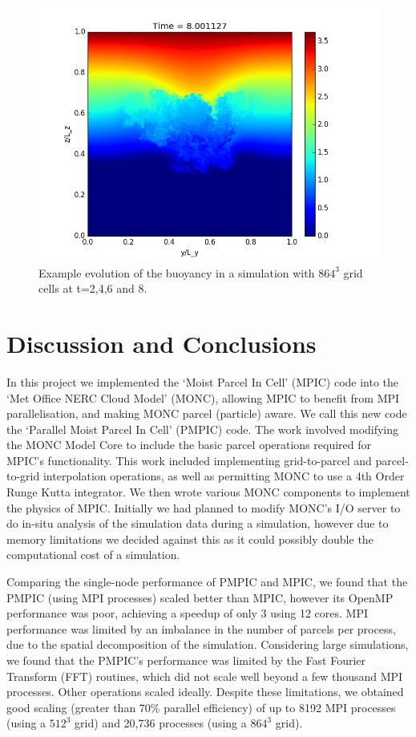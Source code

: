 \documentclass{article}
\begin{document}
\begin{figure}
  \includegraphics[scale=0.4]{pmpic_images/8.png}
  \caption{Example evolution of the buoyancy in a simulation with $864^3$ grid cells at t=2,4,6 and 8.}
  \label{864}
\end{figure}


\section{Discussion and Conclusions} \label{discussion}
In this project we implemented the `Moist Parcel In Cell' (MPIC) code into the `Met Office NERC Cloud Model' (MONC), allowing MPIC to benefit from MPI parallelisation, and making MONC parcel (particle) aware. We call this new code the `Parallel Moist Parcel In Cell' (PMPIC) code. The work involved modifying the MONC Model Core to include the basic parcel operations required for MPIC's functionality. This work included implementing grid-to-parcel and parcel-to-grid interpolation operations, as well as permitting MONC to use a 4th Order Runge Kutta integrator. We then wrote various MONC components to implement the physics of MPIC. Initially we had planned to modify MONC's I/O server to do in-situ analysis of the simulation data during a simulation, however due to memory limitations we decided against this as it could possibly double the computational cost of a simulation.

Comparing the single-node performance of PMPIC and MPIC, we found that the PMPIC (using MPI processes) scaled better than MPIC, however its OpenMP performance was poor, achieving a speedup of only 3 using 12 cores. MPI performance was limited by an imbalance in the number of parcels per process, due to the spatial decomposition of the simulation. Considering large simulations, we found that the PMPIC's performance was limited by the Fast Fourier Transform (FFT) routines, which did not scale well beyond a few thousand MPI processes. Other operations scaled ideally. Despite these limitations, we obtained good scaling (greater than 70\% parallel efficiency) of up to 8192 MPI processes (using a $512^3$ grid) and 20,736 processes (using a $864^3$ grid).
\end{document}

